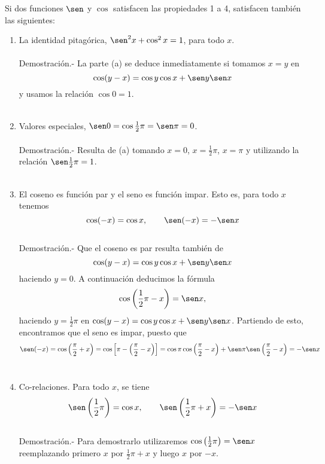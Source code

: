 \begin{teo} Si dos funciones $\sen$ y $\cos$ satisfacen las propiedades 1 a 4, satisfacen también las siguientes:
    \begin{enumerate}[\bfseries (a)]
	
	\item La identidad pitagórica, $\sen^2x + \cos^2 x = 1$, para todo $x$.\\\\
	    Demostración.-\; La parte (a) se deduce inmediatamente si tomamos $x=y$ en $$\cos(y-x) = \cos y \cos x + \sen y \sen x$$
	    y usamos la relación $\cos 0 = 1$.\\\\

	\item Valores especiales, $\sen 0 = \cos \frac{1}{2} \pi = \sen \pi = 0$.\\\\
	    Demostración.-\; Resulta de (a) tomando $x=0$, $x=\frac{1}{2}\pi$, $x=\pi$ y utilizando la relación $\sen \frac{1}{2}\pi = 1$.\\\\

	\item El coseno es función par y el seno es función impar. Esto es, para todo $x$ tenemos
	    $$\cos(-x)=\cos x,\qquad \sen(-x) = -\sen x$$\\
	    Demostración.-\; Que el coseno es par resulta también de $$\cos(y-x) = \cos y \cos x + \sen y \sen x$$ 
	    haciendo $y=0$. A continuación deducimos la fórmula $$\cos \left(\frac{1}{2}\pi - x \right) = \sen x,$$
	    haciendo $y=\frac{1}{2}\pi$ en $\cos(y-x) = \cos y \cos x + \sen y \sen x$. Partiendo de esto, encontramos que el seno es impar, puesto que 
	    $$\sen(-x)=\cos\left(\dfrac{\pi}{2}+x\right) = \cos \left[\pi - \left(\dfrac{\pi}{2} - x\right)\right] = \cos \pi \cos \left(\dfrac{\pi}{2} - x\right) + \sen \pi \sen\left(\dfrac{\pi}{2}-x\right) = -\sen x$$\\
	
	\item Co-relaciones. Para todo $x$, se tiene
	    $$\sen\left(\frac{1}{2} \pi\right) = \cos x, \qquad \sen\left(\frac{1}{2}\pi + x\right) = -\sen x$$\\
	    Demostración.-\; Para demostrarlo utilizaremos $\cos\left(\frac{1}{2}\pi\right)=\sen x$ reemplazando primero $x$ por $\frac{1}{2} \pi + x$ y luego $x$ por $-x$.\\\\


\end{enumerate}
\end{teo}
